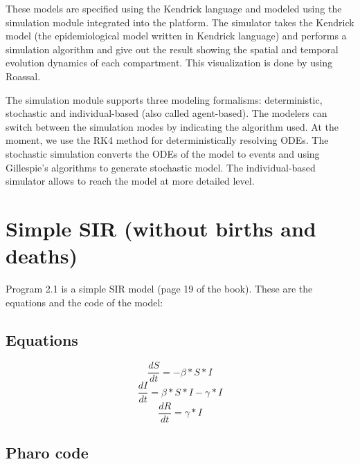 \documentclass[a4paper,10pt,twoside]{book}
\begin{document}
These models are specified using the Kendrick language and modeled using the simulation module integrated into the platform.
The simulator takes the Kendrick model (the epidemiological model written in Kendrick language) and performs a simulation algorithm and give out the result showing the spatial and temporal evolution dynamics of each compartment. This visualization is done by using Roassal.

The simulation module supports three modeling formalisms: deterministic, stochastic and individual-based (also called agent-based).
The modelers can switch between the simulation modes by indicating the algorithm used. At the moment, we use the RK4 method for deterministically resolving ODEs.
The stochastic simulation converts the ODEs of the model to events and using Gillespie's algorithms to generate stochastic model.
The individual-based simulator allows to reach the model at more detailed level.
\section{ Simple SIR (without births and deaths)}
Program 2.1 is a simple SIR model (page 19 of the book). These are the equations and the code of the model:
\subsection{ Equations}

\begin{equation}
\frac{dS}{dt} = -\beta*S*I
\end{equation}
\begin{equation}
\frac{dI}{dt} = \beta*S*I-\gamma*I
\end{equation}
\begin{equation}
\frac{dR}{dt} = \gamma*I
\end{equation}
\subsection{ Pharo code}
\end{document}
